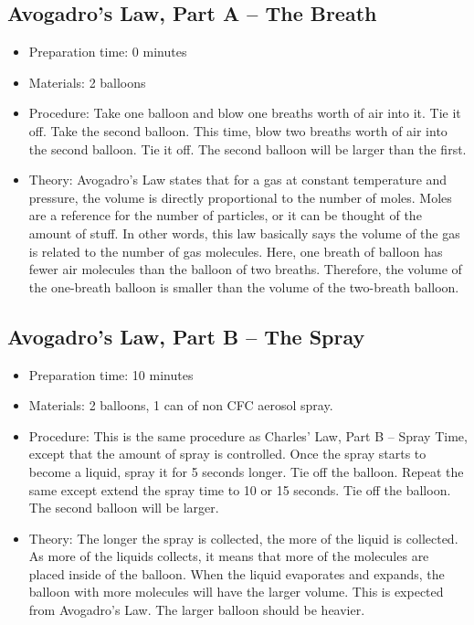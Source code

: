 \subsection{Avogadro's Law, Part A -- The Breath}
\begin{itemize}
\item{Preparation time: 0 minutes}
\item{Materials: 2 balloons}
\item{Procedure: Take one balloon and blow one breaths worth of air into it. Tie it off. Take the second balloon. This time, blow two breaths worth of air into the second balloon. Tie it off. The second balloon will be larger than the first.}
\item{Theory: Avogadro's Law states that for a gas at constant temperature and pressure, the volume is directly proportional to the number of moles. Moles are a reference for the number of particles, or it can be thought of the amount of stuff. In other words, this law basically says the volume of the gas is related to the number of gas molecules. Here, one breath of balloon has fewer air molecules than the balloon of two breaths. Therefore, the volume of the one-breath balloon is smaller than the volume of the two-breath balloon.}
\end{itemize}

\subsection{Avogadro's Law, Part B -- The Spray}
\begin{itemize}
\item{Preparation time: 10 minutes}
\item{Materials: 2 balloons, 1 can of non CFC aerosol spray.}
\item{Procedure: This is the same procedure as Charles' Law, Part B -- Spray Time, except that the amount of spray is controlled. Once the spray starts to become a liquid, spray it for 5 seconds longer. Tie off the balloon. Repeat the same except extend the spray time to 10 or 15 seconds. Tie off the balloon. The second balloon will be larger.}
\item{Theory: The longer the spray is collected, the more of the liquid is collected. As more of the liquids collects, it means that more of the molecules are placed inside of the balloon. When the liquid evaporates and expands, the balloon with more molecules will have the larger volume. This is expected from Avogadro's Law. The larger balloon should be heavier.}
\end{itemize}

